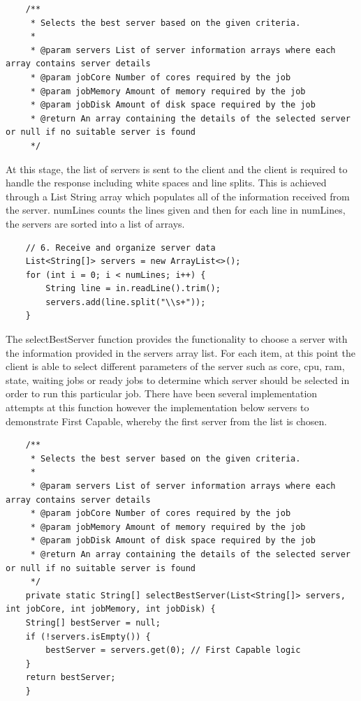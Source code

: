 \begin{lstlisting}
    /**
     * Selects the best server based on the given criteria.
     *
     * @param servers List of server information arrays where each array contains server details
     * @param jobCore Number of cores required by the job
     * @param jobMemory Amount of memory required by the job
     * @param jobDisk Amount of disk space required by the job
     * @return An array containing the details of the selected server or null if no suitable server is found
     */
\end{lstlisting}

At this stage, the list of servers is sent to the client and the client is required to handle the response including white spaces and line splits. This is achieved through a List String array which populates all of the information received from the server. numLines counts the lines given and then for each line in numLines, the servers are sorted into a list of arrays.
\begin{lstlisting}
    // 6. Receive and organize server data
    List<String[]> servers = new ArrayList<>();
    for (int i = 0; i < numLines; i++) {
        String line = in.readLine().trim();
        servers.add(line.split("\\s+"));
    }
\end{lstlisting}

The selectBestServer function provides the functionality to choose a server with the information provided in the servers array list. For each item, at this point the client is able to select different parameters of the server such as core, cpu, ram, state, waiting jobs or ready jobs to determine which server should be selected in order to run this particular job. There have been several implementation attempts at this function however the implementation below servers to demonstrate First Capable, whereby the first server from the list is chosen. 
\begin{lstlisting}
    /**
     * Selects the best server based on the given criteria.
     *
     * @param servers List of server information arrays where each array contains server details
     * @param jobCore Number of cores required by the job
     * @param jobMemory Amount of memory required by the job
     * @param jobDisk Amount of disk space required by the job
     * @return An array containing the details of the selected server or null if no suitable server is found
     */
    private static String[] selectBestServer(List<String[]> servers, int jobCore, int jobMemory, int jobDisk) {
    String[] bestServer = null;
    if (!servers.isEmpty()) {
        bestServer = servers.get(0); // First Capable logic
    }
    return bestServer;
    }
\end{lstlisting}

